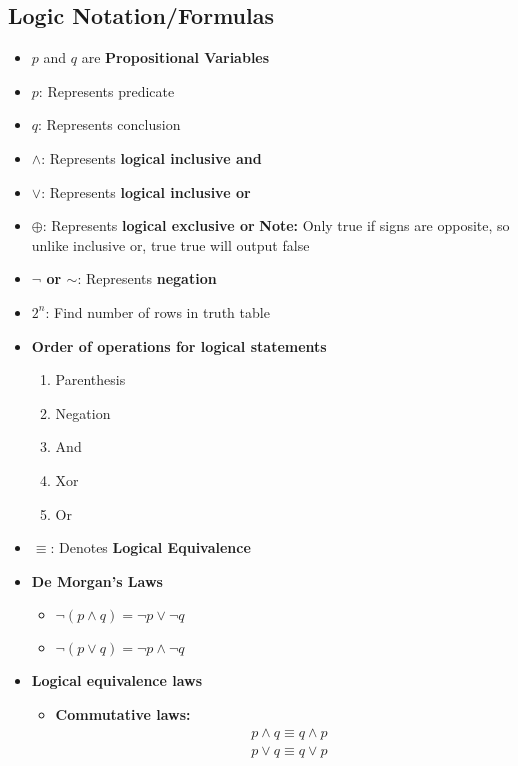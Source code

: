 \documentclass{report}
\begin{document}
    \subsection{Logic Notation/Formulas}
    \bigbreak \noindent 
    \begin{itemize}
      \item $p$ and $q$ are \textbf{Propositional Variables} 
      \item \textbf{$p$}: Represents predicate
      \item \textbf{$q$}: Represents conclusion
      \item \textbf{$\wedge$}: Represents \textbf{logical inclusive and}
      \item \textbf{$\lor$}: Represents \textbf{logical inclusive or}
      \item \textbf{$\oplus$}: Represents \textbf{logical exclusive or}
      \textbf{Note:} Only true if signs are opposite, so unlike inclusive or, true true will output false
      \item \textbf{$\neg$ or $\sim$}: Represents \textbf{negation}
      \item \textbf{$2^{n}$}: Find number of rows in truth table
      \item \textbf{Order of operations for logical statements}
        \begin{enumerate}
          \item Parenthesis
          \item Negation 
          \item And
          \item Xor
          \item Or
        \end{enumerate}
      \item $\equiv$: Denotes \textbf{Logical Equivalence}
      \item \textbf{De Morgan's Laws}
        \begin{itemize}
          \item $\neg(p\land q) = \neg p \lor \neg q$
          \item $\neg(p\lor q) = \neg p \land \neg q$
        \end{itemize}
      \item \textbf{Logical equivalence laws}
        \begin{itemize}
              \item \textbf{Commutative laws:}
    \begin{align*}
        &p \land q \equiv q \land p \\
        &p \lor q \equiv q \lor p
    \end{align*}
    

\end{itemize}
\end{itemize}
\end{document}
